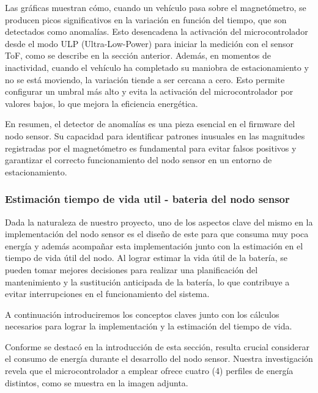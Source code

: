 
Las gráficas muestran cómo, cuando un vehículo pasa sobre el magnetómetro, se producen picos significativos en la variación en función del tiempo, que son detectados como anomalías. Esto desencadena la activación del microcontrolador desde el modo ULP (Ultra-Low-Power) para iniciar la medición con el sensor ToF, como se describe en la sección anterior. Además, en momentos de inactividad, cuando el vehículo ha completado su maniobra de estacionamiento y no se está moviendo, la variación tiende a ser cercana a cero. Esto permite configurar un umbral más alto y evita la activación del microcontrolador por valores bajos, lo que mejora la eficiencia energética.

En resumen, el detector de anomalías es una pieza esencial en el firmware del nodo sensor. Su capacidad para identificar patrones inusuales en las magnitudes registradas por el magnetómetro es fundamental para evitar falsos positivos y garantizar el correcto funcionamiento del nodo sensor en un entorno de estacionamiento.



\subsubsection{Estimación tiempo de vida util - bateria del nodo sensor}{\label{sec:bateria_del_nodo_sensor}}
Dada la naturaleza de nuestro proyecto, uno de los aspectos clave del mismo en la
implementación del nodo sensor es el diseño de este para que consuma muy poca energía y
además acompañar esta implementación junto con la estimación en el tiempo de vida útil
del nodo.
Al lograr estimar la vida útil de la batería, se pueden tomar mejores decisiones para
realizar una planificación del mantenimiento y la sustitución anticipada de la batería,
lo que contribuye a evitar interrupciones en el funcionamiento del sistema.

A continuación introduciremos los conceptos claves junto con los cálculos necesarios
para lograr la implementación y la estimación del tiempo de vida.

Conforme se destacó en la introducción de esta sección, resulta crucial considerar el
consumo de energía durante el desarrollo del nodo sensor. Nuestra investigación revela
que el microcontrolador a emplear ofrece cuatro (4) perfiles de energía distintos, como
se muestra en la imagen adjunta.

